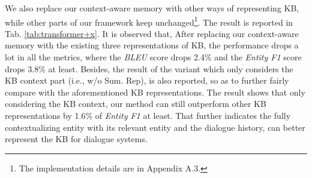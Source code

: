 \documentclass[11pt]{article}
\begin{document}
We also replace our context-aware memory with other ways of representing KB, while other parts of our framework keep unchanged\footnote{The implementation details are in Appendix A.3.}. The result is reported in Tab. \ref{tab:transformer+x}. It is observed that, After replacing our context-aware memory with the existing three representations of KB, the performance drops a lot in all the metrics, where the \textit{BLEU} score drops 2.4\% and the \textit{Entity F1} score drops 3.8\% at least. 
Besides, the result of the variant which only considers the KB context part (i.e., w/o Sum. Rep), is also reported, so as to further fairly compare with the aforementioned KB representations. The result shows that only considering the KB context, our method can still outperform other KB representations by 1.6\% of \textit{Entity F1} at least. That further indicates the fully contextualizing entity with its relevant entity and the dialogue history, can better represent the KB for dialogue systems.



\begin{table}[htb]
\centering
{}
\caption{The performance of replacing the Memory Mask with the full attention. The meanings of the scheme names are that the Memory Mask (\textbf{M}) is replaced with the Full attention (\textbf{F}).}
\label{tab:comb_mem}
\end{table}
\end{document}
